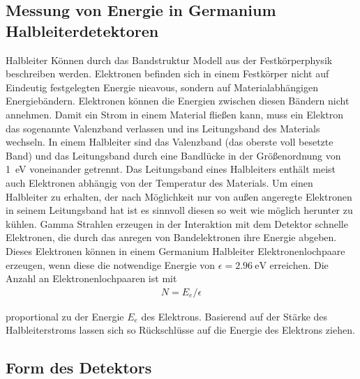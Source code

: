 \subsection{Messung von Energie in Germanium Halbleiterdetektoren \cite{book:gil}}

Halbleiter Können durch das Bandstruktur Modell aus der Festkörperphysik
beschreiben werden. Elektronen befinden sich in einem Festkörper nicht auf Eindeutig festgelegten Energie nieavous, sondern auf Materialabhängigen
Energiebändern. Elektronen können die Energien zwischen diesen Bändern nicht
annehmen. Damit ein Strom in einem Material fließen kann, muss ein Elektron das
sogenannte Valenzband verlassen und ins Leitungsband des Materials wechseln. In
einem Halbleiter sind das Valenzband (das oberste voll besetzte Band) und das
Leitungsband durch eine Bandlücke in der Größenordnung von \qty{1}{\eV}
voneinander getrennt.
Das Leitungsband eines Halbleiters enthält meist auch Elektronen abhängig von
der Temperatur des Materials.
Um einen Halbleiter zu erhalten, der nach Möglichkeit nur von außen angeregte
Elektronen in seinem Leitungsband hat ist es sinnvoll diesen so weit wie
möglich herunter zu kühlen. Gamma Strahlen erzeugen in der Interaktion mit dem
Detektor schnelle Elektronen, die durch das anregen von Bandelektronen ihre
Energie abgeben. Dieses Elektronen können in einem Germanium Halbleiter
Elektronenlochpaare erzeugen, wenn diese die notwendige Energie von $\epsilon =
	\qty{2.96}{\eV}$ erreichen. Die Anzahl an Elektronenlochpaaren ist mit
\begin{align}
	N = E_e / \epsilon
\end{align}

proportional zu der Energie $E_e$ des Elektrons. Basierend auf der Stärke des
Halbleiterstroms lassen sich so Rückschlüsse auf die Energie des Elektrons
ziehen.


\subsection{Form des Detektors \cite[vgl][Kap. 2.4]{book:gil}}

